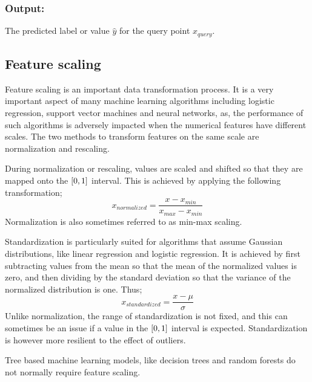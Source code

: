 		\subsubsection{Output:}
		The predicted label or value $\hat{y}$ for the query point $x_{query}$.
		
		
		
		
		
		
		
		

		
		






	\subsection{Feature scaling}

		Feature scaling is an important data transformation process. It is a very important aspect of many machine learning algorithms including logistic regression, support vector machines and neural networks, as, the performance of such algorithms is adversely impacted when the numerical features have different scales. The two methods to transform features on the same scale are normalization and rescaling.
		
		During normalization or rescaling, values are scaled and shifted so that they are mapped onto the $[0,\space 1]$ interval. This is achieved by applying the following transformation;
		$$
		x_{normalized} = \frac{x - x_{min}}{x_{max}-x_{min}}
		$$
		Normalization is also sometimes referred to as min-max scaling.
		
		Standardization is particularly suited for algorithms that assume Gaussian distributions, like linear regression and logistic regression. It is achieved by first subtracting values from the mean so that the mean of the normalized values is zero, and then dividing by the standard deviation so that the variance of the normalized distribution is one. Thus;
		$$
		x_{standardized} = \frac{x - \mu}{\sigma}
		$$
		Unlike normalization, the range of standardization is not fixed, and this can sometimes be an issue if a value in the $[0,\space 1]$ interval is expected.  Standardization is however more resilient to the effect of outliers.
		
		Tree based machine learning models, like decision trees and random forests do not normally require feature scaling.


	
